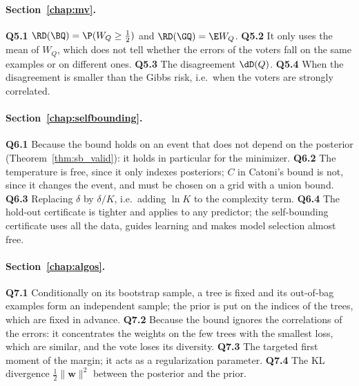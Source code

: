 \paragraph{Section~\ref{chap:mv}.}
\textbf{Q5.1} $\RD(\BQ)=\P(W_Q\geq\frac12)$ and $\RD(\GQ)=\E W_Q$.
\textbf{Q5.2} It only uses the mean of $W_Q$, which does not tell whether the errors
of the voters fall on the same examples or on different ones.
\textbf{Q5.3} The disagreement $\dD(Q)$.
\textbf{Q5.4} When the disagreement is smaller than the Gibbs risk, i.e.\ when the voters are strongly correlated.

\paragraph{Section~\ref{chap:selfbounding}.}
\textbf{Q6.1} Because the bound holds on an event that does not depend on the posterior
(Theorem~\ref{thm:sb_valid}): it holds in particular for the minimizer.
\textbf{Q6.2} The temperature is free, since it only indexes posteriors; $C$ in
Catoni's bound is not, since it changes the event, and must be chosen on a grid with a
union bound.
\textbf{Q6.3} Replacing $\delta$ by $\delta/K$, i.e.\ adding $\ln K$ to the complexity term.
\textbf{Q6.4} The hold-out certificate is tighter and applies to any predictor; the
self-bounding certificate uses all the data, guides learning and makes model selection almost free.

\paragraph{Section~\ref{chap:algos}.}
\textbf{Q7.1} Conditionally on its bootstrap sample, a tree is fixed and its
out-of-bag examples form an independent sample; the prior is put on the indices of
the trees, which are fixed in advance.
\textbf{Q7.2} Because the bound ignores the correlations of the errors: it concentrates
the weights on the few trees with the smallest loss, which are similar, and the vote
loses its diversity.
\textbf{Q7.3} The targeted first moment of the margin; it acts as a regularization parameter.
\textbf{Q7.4} The KL divergence $\frac12\|\mathbf w\|^2$ between the posterior and the prior.
